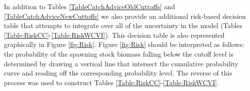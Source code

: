 


In addition to Tables \ref{TableCatchAdviceOldCuttoffs} and \ref{TableCatchAdviceNewCuttoffs} we also provide an additional risk-based decision table that attempts to integrate over all of the uncertainty in the model (Tables \ref{Table:RiskCC}-\ref{Table:RiskWCVI}).  This decision table is also represented graphically in Figure \ref{fig:Risk}.  Figure \ref{fig:Risk} should be interpreted as follows: the probability of the spawning stock biomass falling below the cutoff level is determined by drawing a vertical line that intersect the cumulative probability curve and reading off the corresponding probability level. The reverse of this process was used to construct Tables \ref{Table:RiskCC}-\ref{Table:RiskWCVI}.
\clearpage






